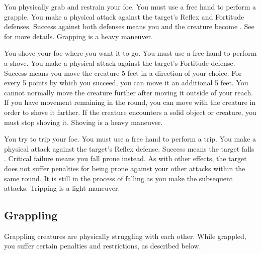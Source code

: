             \label{Grapple} You physically grab and restrain your foe.
            You must use a free hand to perform a grapple.
            You make a physical attack against the target's Reflex and Fortitude defenses.
            Success against both defenses means you and the creature become \grappled.
            See  for more details.
            Grapping is a heavy maneuver.

            \label{Shove} You shove your foe where you want it to go.
            You must use a free hand to perform a shove.
            You make a physical attack against the target's Fortitude defense.
            Success means you move the creature 5 feet in a direction of your choice.
            For every 5 points by which you succeed, you can move it an additional 5 feet.
            You cannot normally move the creature further after moving it outside of your reach.
            If you have movement remaining in the round, you can move with the creature in order to shove it farther.
            If the creature encounters a solid object or creature, you must stop shoving it.
            Shoving is a heavy maneuver.

            \label{Trip} You try to trip your foe.
            You must use a free hand to perform a trip.
            You make a physical attack against the target's Reflex defense.
            Success means the target falls \prone.
            Critical failure means you fall prone instead.
            As with other effects, the target does not suffer penalties for being prone against your other attacks within the same round.
            It is still in the process of falling as you make the subsequent attacks.
            Tripping is a light maneuver.

    \subsection{Grappling}\label{Grappling}
        Grappling creatures are physically struggling with each other. While grappled, you suffer certain penalties and restrictions, as described below.

